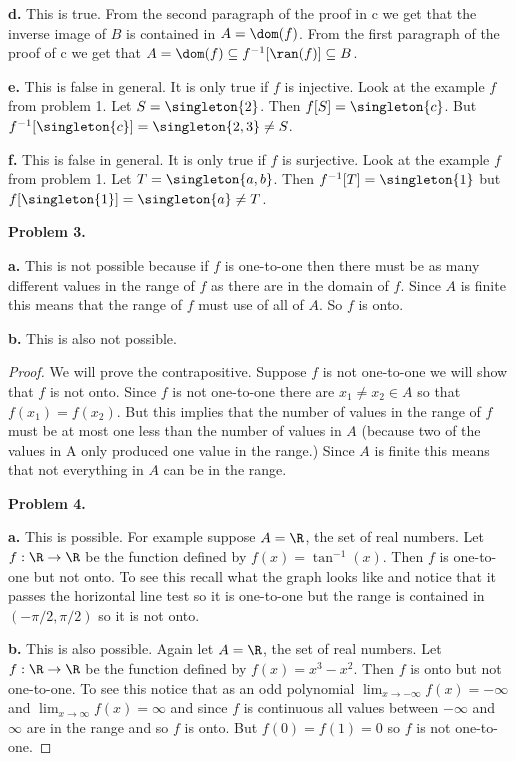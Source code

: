 \documentclass[oneside,12pt]{amsart}
\begin{document}
\textbf{d.} This is true. From the second paragraph of the proof in c we
get that the inverse image of $B$ is contained in $A = \dom(f)$. From the
first paragraph of the proof of c we get that
$A = \dom(f)\subseteq f^{-1}[\ran(f)] \subseteq B$.

\textbf{e.} This is false in general. It is only true if $f$ is injective.
Look at the example $f$ from problem 1. Let $S = \singleton{2}$. Then
$f[S] = \singleton{c}$. But $f^{-1}[\singleton{c}] = \singleton{2,3} \not= S$.


\textbf{f.} This is false in general. It is only true if $f$ is surjective.
Look at the example $f$ from problem 1. Let $T=\singleton{a,b}$. Then
$f^{-1}[T] = \singleton{1}$ but $f[\singleton{1}] = \singleton{a} \not= T$.

\medskip

\textbf{Problem 3.}

\textbf{a.} This is not possible because if $f$ is one-to-one then there must
be as many different values in the range of $f$ as there are in the domain
of $f$. Since $A$ is finite this means that the range of $f$ must use of all
of $A$. So $f$ is onto.

\textbf{b.} This is also not possible.
\begin{proof}
We will prove the contrapositive. Suppose $f$ is not one-to-one we will show
that $f$ is not onto. Since $f$ is not one-to-one there are $x_1\not=x_2\in A$
so that $f(x_1) = f(x_2)$. But this implies that the number of values in
the range of $f$ must be at most one less than the number of values in $A$
(because two of the values in A only produced one value in the range.) Since
$A$ is finite this means that not everything in $A$ can be in the range.

\medskip

\textbf{Problem 4.}

\textbf{a.} This is possible. For example suppose $A=\R$, the set of real
numbers. Let $f:\R\to\R$ be the function defined by $f(x)=\tan^{-1}(x)$.
Then $f$ is one-to-one but not onto. To see this recall what the graph looks
like and notice that it passes the horizontal line test so it is one-to-one
but the range is contained in $(-\pi/2, \pi/2)$ so it is not onto.

\textbf{b.} This is also possible. Again let $A=\R$, the set of real
numbers. Let $f:\R\to\R$ be the function defined by $f(x) = x^3 - x^2$. Then
$f$ is onto but not one-to-one. To see this notice that as an odd polynomial
$\lim_{x\to-\infty}f(x) = -\infty$ and $\lim_{x\to\infty}f(x) = \infty$ and
since $f$ is continuous all values between $-\infty$ and $\infty$ are in the
range and so $f$ is onto. But $f(0) = f(1) = 0$ so $f$ is not one-to-one.
\end{proof}
\end{document}
